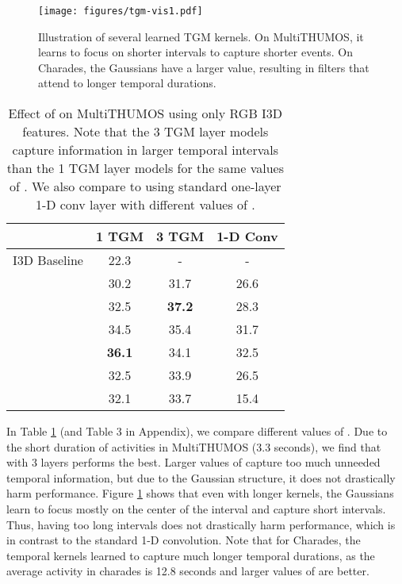 \documentclass{article}
\begin{document}
\begin{figure}
    \centering
    \texttt{[image: figures/tgm-vis1.pdf]}
    \caption{Illustration of several learned TGM kernels. On MultiTHUMOS, it learns to focus on shorter intervals to capture shorter events. On Charades, the Gaussians have a larger  value, resulting in filters that attend to longer temporal durations.}
    \label{fig:tgm-vis}
\end{figure}

\begin{table}
\caption{Effect of  on MultiTHUMOS using only RGB I3D features. Note that the 3 TGM layer models capture information in larger temporal intervals than the 1 TGM layer models for the same values of . We also compare to using standard one-layer 1-D conv layer with different values of .}
\label{tab:l-exp-mt}
\centering
\begin{tabular}{c|ccc}
\toprule
 &  1 TGM & 3 TGM & 1-D Conv  \\
\midrule
I3D Baseline   & 22.3 & -      & -      \\
      & 30.2 &  31.7      & 26.6   \\
      & 32.5 &  \bf{37.2} & 28.3   \\
     & 34.5 &  35.4      & 31.7   \\
     & \bf{36.1} &  34.1 & 32.5   \\
     & 32.5 &  33.9      & 26.5   \\
     & 32.1 &  33.7      & 15.4  \\
\bottomrule
\end{tabular}
\end{table}


In Table \ref{tab:l-exp-mt} (and Table 3 in Appendix), we compare different values of . Due to the short duration of activities in MultiTHUMOS (3.3 seconds), we find that  with 3 layers performs the best.  Larger values of  capture too much unneeded temporal information, but due to the Gaussian structure, it does not drastically harm performance. Figure \ref{fig:tgm-vis} shows that even with longer kernels, the Gaussians learn to focus mostly on the center of the interval and capture short intervals. Thus, having too long intervals does not drastically harm performance, which is in contrast to the standard 1-D convolution. Note that for Charades, the temporal kernels learned to capture much longer temporal durations, as the average activity in charades is 12.8 seconds and larger values of  are better.

\vspace{-3pt}
\end{document}
